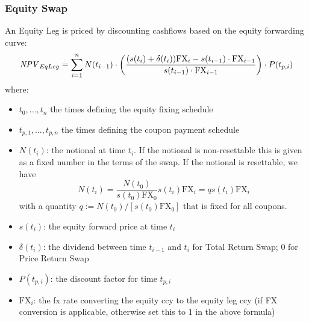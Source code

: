 \subsubsection{Equity Swap}
\label{pricing::eq_swap}

An Equity Leg is priced by discounting cashflows based on the 
equity forwarding curve:
$$
\mathit{NPV}_{EqLeg} = \sum_{i=1}^n N(t_{i-1})\cdot \left(\frac{(s(t_i) + \delta(t_i)) \text{FX}_i - s(t_{i-1})\cdot \text{FX}_{i-1}
  }{s(t_{i-1}) \cdot \text{FX}_{i-1}}\right) \cdot P(t_{p,i})
$$
where:
\begin{itemize}
\item $t_0, \ldots, t_n$ the times defining the equity fixing schedule
\item $t_{p,1}, \ldots, t_{p,n}$ the times defining the coupon payment schedule
\item $N(t_i)$: the notional at time $t_i$. If the notional is non-resettable this is given as a fixed number in the
  terms of the swap. If the notional is resettable, we have
  $$N(t_i) = \frac{N(t_0)}{s(t_0) \text{FX}_0} s(t_i) \text{FX}_i = q s(t_i) \text{FX}_i$$
  with a quantity $q := N(t_0) / [ s(t_0) \text{FX}_0 ]$ that is fixed for all coupons.
\item $s(t_i)$: the equity forward price at time $t_i$
\item $\delta(t_i)$: the dividend between time $t_{i-1}$ and $t_i$ for Total Return Swap; $0$ for Price Return Swap 
\item $P(t_{p,i})$: the discount factor for time $t_{p,i}$
\item $\text{FX}_i$: the fx rate converting the equity ccy to the equity leg ccy (if FX conversion is applicable, otherwise set
  this to $1$ in the above formula)
\end{itemize}

